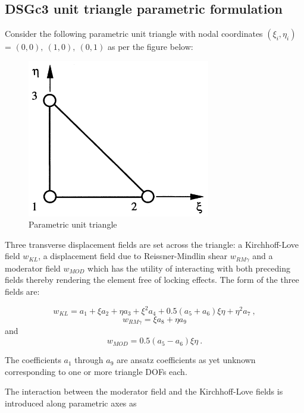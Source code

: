 \subsection{DSGc3 unit triangle parametric formulation}
Consider the following parametric unit triangle with nodal coordinates $(\xi_i,\eta_i)$ = $(0,0),\ (1,0),\ (0,1)$ as per the figure below:

\begin{figure}[H]
	\centering
	\includegraphics[width=8cm]{images/parametric_unit_triangle.png}
	\caption{Parametric unit triangle \cite{Ble00}}
	\label{fig:parametric_unit_triangle}
\end{figure}

Three transverse displacement fields are set across the triangle: a Kirchhoff-Love field $w_{KL}$, a displacement field due to Reissner-Mindlin shear $w_{RM \gamma}$ and a moderator field $w_{MOD}$ which has the utility of interacting with both preceding fields thereby rendering the element free of locking effects. The form of the three fields are:

\begin{equation} 
w_{KL} = a_1 + \xi a_2 + \eta a_3 + \xi^2 a_4 + 0.5(a_5 + a_6)\xi \eta + \eta^2 a_7
\label{eqDSGc3_1}\ ,
\end{equation}
\begin{equation} 
w_{RM \gamma} = \xi a_8 + \eta a_9
\label{eqDSGc3_2}
\end{equation}
and
\begin{equation} 
w_{MOD} = 0.5(a_5 - a_6)\xi \eta
\label{eqDSGc3_3}\ .
\end{equation}

The coefficients $a_1$ through $a_9$ are ansatz coefficients as yet unknown corresponding to one or more triangle DOFs each.

The interaction between the moderator field and the Kirchhoff-Love fields is introduced along parametric axes as

